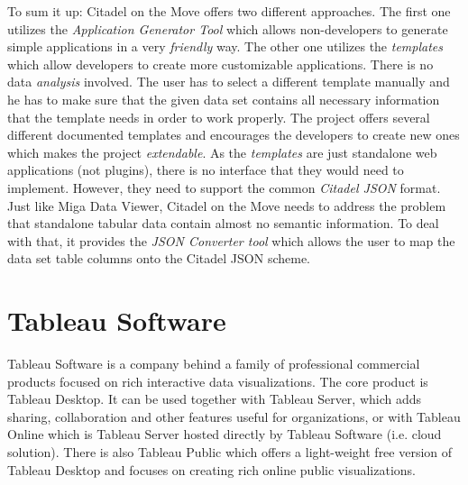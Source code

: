 To sum it up: Citadel on the Move offers two different approaches. The first one utilizes the \emph{Application Generator Tool} which allows non-developers to generate simple applications in a very \emph{friendly} way. The other one utilizes the \emph{templates} which allow developers to create more customizable applications. There is no data \emph{analysis} involved. The user has to select a different template manually and he has to make sure that the given data set contains all necessary information that the template needs in order to work properly. The project offers several different documented templates and encourages the developers to create new ones which makes the project \emph{extendable}. As the \emph{templates} are just standalone web applications (not plugins), there is no interface that they would need to implement. However, they need to support the common \emph{Citadel JSON} format. Just like Miga Data Viewer, Citadel on the Move needs to address the problem that standalone tabular data contain almost no semantic information. To deal with that, it provides the \emph{JSON Converter tool} which allows the user to map the data set table columns onto the Citadel JSON scheme.

\section{Tableau Software}

Tableau Software \cite{tableau} is a company behind a family of professional commercial products focused on rich interactive data visualizations. The core product is Tableau Desktop. It can be used together with Tableau Server, which adds sharing, collaboration and other features useful for organizations, or with Tableau Online which is Tableau Server hosted directly by Tableau Software (i.e. cloud solution). There is also Tableau Public which offers a light-weight free version of Tableau Desktop and focuses on creating rich online public visualizations.

